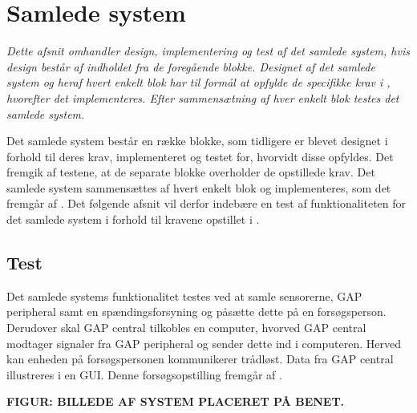 \section{Samlede system}
\textit{Dette afsnit omhandler design, implementering og test af det samlede system, hvis design består af indholdet fra de foregående blokke. Designet af det samlede system og heraf hvert enkelt blok har til formål at opfylde de specifikke krav i , hvorefter det implementeres. Efter sammensætning af hver enkelt blok testes det samlede system.}

Det samlede system består en række blokke, som tidligere er blevet designet i forhold til deres krav, implementeret og testet for, hvorvidt disse opfyldes. Det fremgik af testene, at de separate blokke overholder de opstillede krav. Det samlede system sammensættes af hvert enkelt blok og implementeres, som det fremgår af . Det følgende afsnit vil derfor indebære en test af funktionaliteten for det samlede system i forhold til kravene opstillet i . 

\subsection{Test}
Det samlede systems funktionalitet testes ved at samle sensorerne, GAP peripheral samt en spændingsforsyning og påsætte dette på en forsøgsperson. Derudover skal GAP central tilkobles en computer, hvorved GAP central modtager signaler fra GAP peripheral og sender dette ind i computeren. Herved kan enheden på forsøgspersonen kommunikerer trådløst. Data fra GAP central illustreres i en GUI. Denne forsøgsopstilling fremgår af .

\textbf{FIGUR: BILLEDE AF SYSTEM PLACERET PÅ BENET.} \\

